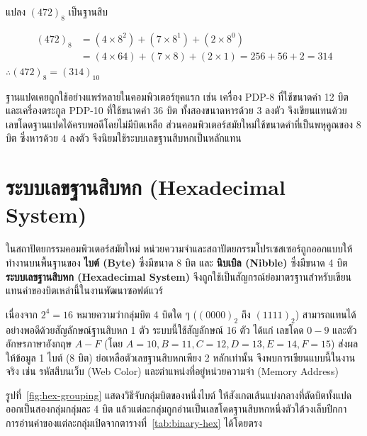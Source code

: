 \begin{ex}
\label{ex:oct-to-dec-472}
แปลง $(472)_8$ เป็นฐานสิบ
\end{ex}
\begin{solution}
\begin{align*}
(472)_8 &= (4\times8^2)+(7\times8^1)+(2\times8^0)\\
&= (4 \times 64) + (7 \times 8) + (2 \times 1) = 256 + 56 + 2 = 314
\end{align*}
$\therefore (472)_8 = (314)_{10}$ \solhere
\end{solution}

\begin{rem}
\label{rem:octal-history}
ฐานแปดเคยถูกใช้อย่างแพร่หลายในคอมพิวเตอร์ยุคแรก เช่น เครื่อง PDP-8 ที่ใช้ขนาดคำ 12 บิต และเครื่องตระกูล PDP-10 ที่ใช้ขนาดคำ 36 บิต ทั้งสองขนาดหารด้วย 3 ลงตัว จึงเขียนแทนด้วยเลขโดดฐานแปดได้ครบพอดีโดยไม่มีบิตเหลือ ส่วนคอมพิวเตอร์สมัยใหม่ใช้ขนาดคำที่เป็นพหุคูณของ 8 บิต ซึ่งหารด้วย 4 ลงตัว จึงนิยมใช้ระบบเลขฐานสิบหกเป็นหลักแทน
\end{rem}

\section{ระบบเลขฐานสิบหก (Hexadecimal System)}
\label{sec:hexadecimal-system}

ในสถาปัตยกรรมคอมพิวเตอร์สมัยใหม่ หน่วยความจำและสถาปัตยกรรมโปรเซสเซอร์ถูกออกแบบให้ทำงานบนพื้นฐานของ \textbf{ไบต์ (Byte)} ซึ่งมีขนาด 8 บิต และ \textbf{นิบเบิล (Nibble)} ซึ่งมีขนาด 4 บิต \textbf{ระบบเลขฐานสิบหก (Hexadecimal System)} จึงถูกใช้เป็นสัญกรณ์ย่อมาตรฐานสำหรับเขียนแทนค่าของบิตเหล่านี้ในงานพัฒนาซอฟต์แวร์~\parencite{tremblay1975structures}

เนื่องจาก $2^4 = 16$ หมายความว่ากลุ่มบิต 4 บิตใด ๆ ($(0000)_2$ ถึง $(1111)_2$) สามารถแทนได้อย่างพอดีด้วยสัญลักษณ์ฐานสิบหก 1 ตัว ระบบนี้ใช้สัญลักษณ์ 16 ตัว ได้แก่ เลขโดด $0-9$ และตัวอักษรภาษาอังกฤษ $A-F$ (โดย $A=10, B=11, C=12, D=13, E=14, F=15$) ส่งผลให้ข้อมูล 1 ไบต์ (8 บิต) ย่อเหลือตัวเลขฐานสิบหกเพียง 2 หลักเท่านั้น จึงพบการเขียนแบบนี้ในงานจริง เช่น รหัสสีบนเว็บ (Web Color) และตำแหน่งที่อยู่หน่วยความจำ (Memory Address)

รูปที่~\ref{fig:hex-grouping} แสดงวิธีจับกลุ่มบิตของหนึ่งไบต์ ให้สังเกตเส้นแบ่งกลางที่ตัดบิตทั้งแปดออกเป็นสองกลุ่มกลุ่มละ 4 บิต แล้วแต่ละกลุ่มถูกอ่านเป็นเลขโดดฐานสิบหกหนึ่งตัวใต้วงเล็บปีกกา การอ่านค่าของแต่ละกลุ่มเปิดจากตารางที่~\ref{tab:binary-hex} ได้โดยตรง

